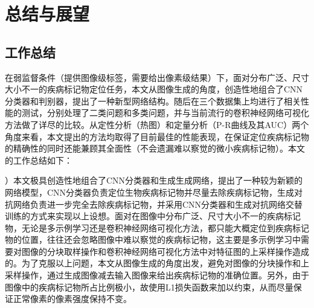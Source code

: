 \chapter{总结与展望}
\section{工作总结}

在弱监督条件（提供图像级标签，需要给出像素级结果）下，面对分布广泛、尺寸大小不一的疾病标记物定位任务，本文从图像生成的角度，创造性地组合了CNN分类器和判别器，提出了一种新型网络结构。随后在三个数据集上均进行了相关性能的测试，分别处理了二类问题和多类问题，并与当前流行的卷积神经网络可视化方法做了详尽的比较。从定性分析（热图）和定量分析（P-R曲线及其AUC）两个角度来看，本文提出的方法均取得了目前最佳的性能表现，在保证定位疾病标记物的精确性的同时还能兼顾其全面性（不会遗漏难以察觉的微小疾病标记物）。本文的工作总结如下：

）本文极具创造性地组合了CNN分类器和生成生成网络，提出了一种较为新颖的网络模型，CNN分类器负责定位生物疾病标记物并尽量去除疾病标记物，生成对抗网络负责进一步完全去除疾病标记物，并采用CNN分类器和生成对抗网络交替训练的方式来实现以上设想。面对在图像中分布广泛、尺寸大小不一的疾病标记物，无论是多示例学习还是卷积神经网络可视化方法，都只能大概定位到疾病标记物的位置，往往还会忽略图像中难以察觉的疾病标记物，这主要是多示例学习中需要对图像的分块取样操作和卷积神经网络可视化方法中对特征图的上采样操作造成的。为了克服以上问题，本文从图像生成的角度出发，避免对图像的分块操作和上采样操作，通过生成图像减去输入图像来给出疾病标记物的准确位置。另外，由于图像中的疾病标记物所占比例极小，故使用L1损失函数来加以约束，从而尽量保证正常像素的像素强度保持不变。

